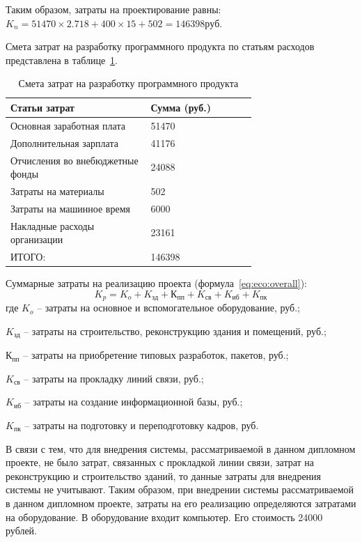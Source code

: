 \documentclass[utf8,usehyperref,12pt]{G7-32}
\begin{document}
Таким образом, затраты на проектирование равны:
$K_n = 51470 \times 2.718 + 400 \times 15 + 502 = 146398 руб.$ 

Смета затрат на разработку программного продукта по статьям расходов представлена в таблице~\ref{T:M}.

\begin{longtable}[c]{|p{0.4\linewidth}|p{0.3\linewidth}|}
\caption{Смета затрат на разработку программного продукта \label{T:M}}\\
\hline Статьи затрат &  Сумма (руб.) \\ 
\hline Основная заработная плата & 51470 \\ 
\hline Дополнительная зарплата & 41176 \\ 
\hline Отчисления во внебюджетные фонды & 24088 \\ 
\hline Затраты на материалы & 502 \\ 
\hline Затраты на машинное время & 6000 \\ 
\hline Накладные расходы организации & 23161 \\ 
\hline ИТОГО: & 146398 \\ 
\hline
\end{longtable}

Суммарные затраты на реализацию проекта (формула~\ref{eq:eco:overall}):
\begin{equation}
  \label{eq:eco:overall}
  K_p = K_o + K_{зд} + К_{пп} + K_{св} + K_{иб} + K_{пк}
\end{equation}
где $K_o$ – затраты на основное и вспомогательное оборудование, руб.;

$K_{зд}$ – затраты на строительство, реконструкцию здания и помещений, руб.;

$К_{пп}$ – затраты на приобретение типовых разработок, пакетов, руб.;

$K_{св}$ – затраты на прокладку линий связи, руб.;

$K_{иб}$ – затраты на создание информационной базы, руб.;

$K_{пк}$ – затраты на подготовку и переподготовку кадров, руб.

В связи с тем, что для внедрения системы, рассматриваемой в данном дипломном проекте, не было затрат, связанных с прокладкой линии связи, затрат на реконструкцию и строительство зданий, то данные затраты для внедрения системы не учитывают. Таким образом, при внедрении системы рассматриваемой в данном дипломном проекте, затраты на его реализацию определяются затратами на оборудование. В оборудование входит компьютер. Его стоимость 24000 рублей.
\end{document}
